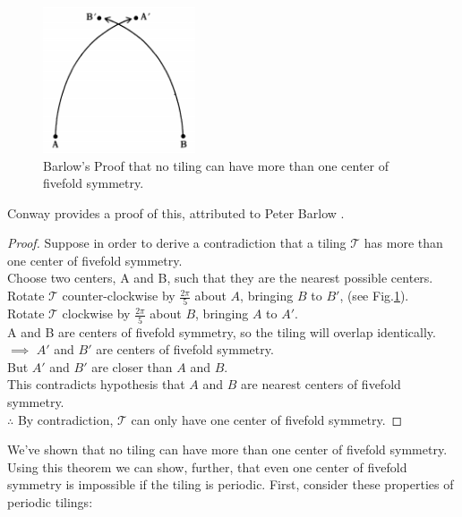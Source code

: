 \documentclass[]{article}
\begin{document}
\begin{figure}[H]
	\centering
	\includegraphics[width=0.4\textwidth]{proof}
    \caption{Barlow's Proof that no tiling can have more than one center of fivefold symmetry.}
    \label{fig:fivefoldproof}
\end{figure}

Conway provides a proof of this, attributed to Peter Barlow \cite{Gardner1997}.

\begin{proof}
Suppose in order to derive a contradiction that a tiling $\mathcal{T}$ has more than one center of fivefold symmetry.\\
Choose two centers, A and B, such that they are the nearest possible centers. \\
Rotate $\mathcal{T}$ counter-clockwise by $\frac{2\pi}{5}$ about $A$, bringing $B$ to $B'$, (see Fig.\ref{fig:fivefoldproof}).\\
Rotate $\mathcal{T}$ clockwise by $\frac{2\pi}{5}$ about $B$, bringing $A$ to $A'$.\\
A and B are centers of fivefold symmetry, so the tiling will overlap identically.\\
$\implies$ $A'$ and $B'$ are centers of fivefold symmetry.\\
But $A'$ and $B'$ are closer than $A$ and $B$.\\
This contradicts hypothesis that $A$ and $B$ are nearest centers of fivefold symmetry.\\
$\therefore$ By contradiction, $\mathcal{T}$ can only have one center of fivefold symmetry.
\end{proof}

We've shown that no tiling can have more than one center of fivefold symmetry. Using this theorem we can show, further, that even one center of fivefold symmetry is impossible if the tiling is periodic. First, consider these properties of periodic tilings:
\end{document}
